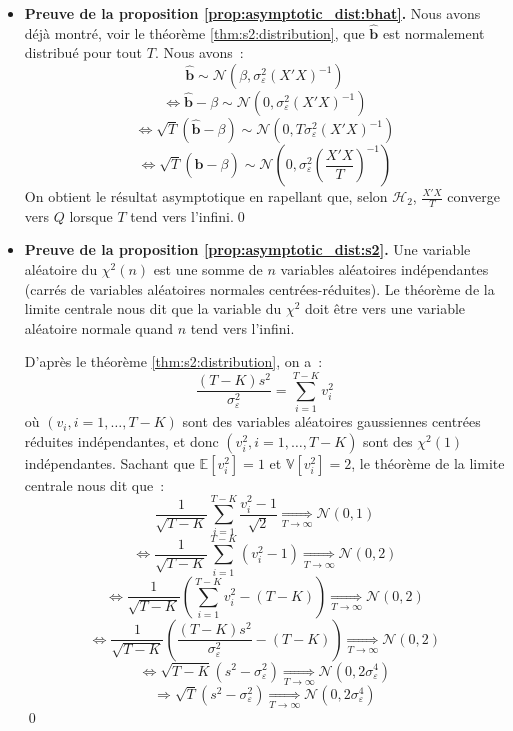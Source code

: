 \documentclass[10pt]{beamer}
\theoremstyle{plain}
\begin{document}
\begin{notes}

  \begin{itemize}

  \item \textbf{Preuve de la proposition \ref{prop:asymptotic_dist:bhat}.} Nous avons déjà montré, voir le théorème \ref{thm:s2:distribution}, que $\hat{\mathbf b}$ est normalement distribué pour tout $T$. Nous avons~:
    \[
      \hat{\mathbf b} \sim \mathcal N \left( \beta, \sigma_{\varepsilon}^2(X'X)^{-1}\right)
    \]
    \[
      \Leftrightarrow \hat{\mathbf b}-\beta \sim \mathcal N \left( 0, \sigma_{\varepsilon}^2(X'X)^{-1}\right)
    \]
    \[
      \Leftrightarrow \sqrt{T}\left( \hat{\mathbf b}-\beta \right) \sim \mathcal N \left( 0, T \sigma_{\varepsilon}^2(X'X)^{-1}\right)
    \]
    \[
      \Leftrightarrow \sqrt{T}\left( \hat{\mathbf b}-\beta \right) \sim \mathcal N \left( 0, \sigma_{\varepsilon}^2\left( \frac{X'X}{T} \right)^{-1}\right)
    \]
    On obtient le résultat asymptotique en rapellant que, selon $\mathcal H_2$, $\frac{X'X}{T}$ converge vers $Q$ lorsque $T$ tend vers l'infini.\qed\newline

  \item \textbf{Preuve de la proposition \ref{prop:asymptotic_dist:s2}.} Une variable aléatoire du $\chi^2(n)$ est une somme de $n$ variables aléatoires indépendantes (carrés de variables aléatoires normales centrées-réduites). Le théorème de la limite centrale nous dit que la variable du $\chi^2$ doit être vers une variable aléatoire normale quand $n$ tend vers l'infini.\newline

    D'après le théorème \ref{thm:s2:distribution}, on a~:
    \[
      \frac{(T-K)s^2}{\sigma_{\varepsilon}^2} = \sum_{i=1}^{T-K}v_i^2
    \]
    où $(v_i, i=1,\dots,T-K)$ sont des variables aléatoires gaussiennes centrées réduites indépendantes, et donc $(v_i^2, i=1,\dots,T-K)$ sont des $\chi^2(1)$ indépendantes. Sachant que $\mathbb E\left[ v_i^2 \right]=1$ et $\mathbb V\left[ v_i^2 \right]=2$, le théorème de la limite centrale nous dit que~:
    \[
      \frac{1}{\sqrt{T-K}}\sum_{i=1}^{T-K}\frac{v_i^2-1}{\sqrt{2}} \underset{T\to\infty}{\Longrightarrow} \mathcal N(0,1)
    \]
    \[
      \Leftrightarrow \frac{1}{\sqrt{T-K}}\sum_{i=1}^{T-K} \left( v_i^2-1 \right) \underset{T\to\infty}{\Longrightarrow} \mathcal N(0,2)
    \]
    \[
      \Leftrightarrow \frac{1}{\sqrt{T-K}}\left( \sum_{i=1}^{T-K}v_i^2 - (T-K) \right) \underset{T\to\infty}{\Longrightarrow} \mathcal N(0,2)
    \]
    \[
      \Leftrightarrow \frac{1}{\sqrt{T-K}}\left( \frac{(T-K)s^2}{\sigma_{\varepsilon}^2} - (T-K) \right) \underset{T\to\infty}{\Longrightarrow} \mathcal N(0,2)
    \]
    \[
      \Leftrightarrow \sqrt{T-K}\left( s^2 - \sigma_{\varepsilon}^2 \right) \underset{T\to\infty}{\Longrightarrow} \mathcal N\left(0,2\sigma_{\varepsilon}^4 \right)
    \]
    \[
      \Rightarrow \sqrt{T}\left( s^2 - \sigma_{\varepsilon}^2 \right) \underset{T\to\infty}{\Longrightarrow} \mathcal N\left(0,2\sigma_{\varepsilon}^4 \right)
    \]
    \qed
  \end{itemize}

\end{notes}
\end{document}
